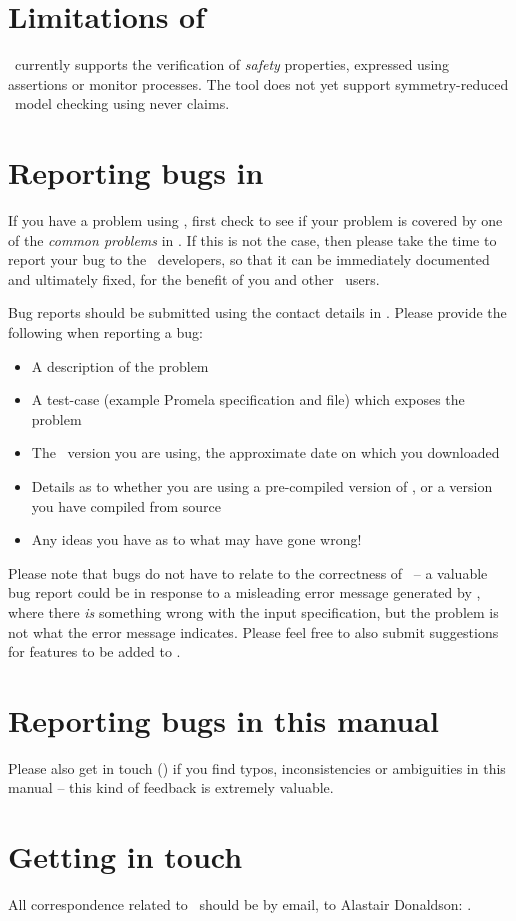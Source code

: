 \section{Limitations of \protect\topspin}
%
\topspin\ currently supports the verification of \emph{safety}
properties, expressed using assertions or monitor processes.  The
tool does not yet support symmetry-reduced \ltl\ model checking
using never claims.
%
\section{Reporting bugs in \protect\topspin}\label{sec:troubleshooting:reportingbugs}
%
If you have a problem using \topspin, first check to see if your
problem is covered by one of the \emph{common problems} in
.  If this is not the case, then
please take the time to report your bug to the \topspin\ developers,
so that it can be immediately documented and ultimately fixed, for
the benefit of you and other \topspin\ users.

Bug reports should be submitted using the contact details in
.  Please provide the
following when reporting a bug:

\begin{itemize}
\item A description of the problem
\item A test-case (example Promela specification and  file) which exposes the problem
\item The \topspin\ version you are using, the approximate date on which you downloaded \topspin
\item Details as to whether you are using a pre-compiled version of \topspin, or a version you have compiled from source
\item Any ideas you have as to what may have gone wrong!
\end{itemize}

Please note that bugs do not have to relate to the correctness of
\topspin\ -- a valuable bug report could be in response to a
misleading error message generated by \topspin, where there
\emph{is} something wrong with the input specification, but the
problem is not what the error message indicates.  Please feel free
to also submit suggestions for features to be added to \topspin.

\section{Reporting bugs in this manual}

Please also get in touch ()
if you find typos, inconsistencies or ambiguities in this manual --
this kind of feedback is extremely valuable.

\section{Getting in touch}\label{sec:troubleshooting:gettingintouch}

All correspondence related to \topspin\ should be by email, to
Alastair Donaldson: .
